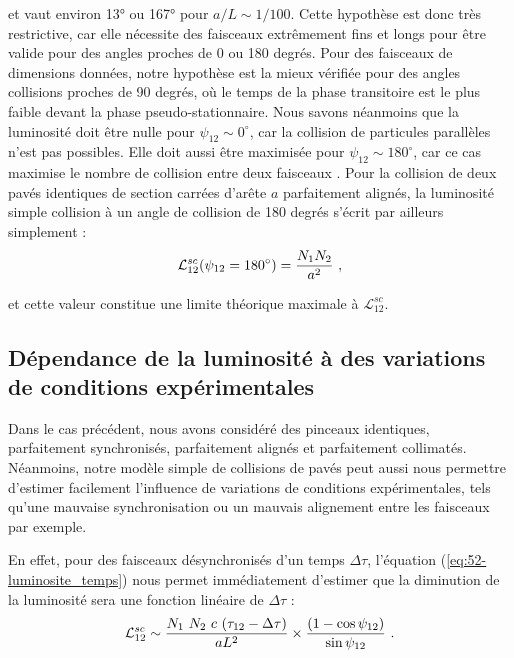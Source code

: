 \begin{refsection}
et vaut environ 13° ou 167° pour $a/L \sim 1/100$. Cette hypothèse est donc très restrictive, car elle nécessite des faisceaux extrêmement fins et longs pour être valide pour des angles proches de 0 ou 180 degrés. Pour des faisceaux de dimensions données, notre hypothèse est la mieux vérifiée pour des angles collisions proches de 90 degrés, où le temps de la phase transitoire est le plus faible devant la phase pseudo-stationnaire. Nous savons néanmoins que la luminosité doit être nulle pour $\psi_{12} \sim 0^\circ$, car la collision de particules parallèles n'est pas possibles. Elle doit aussi être maximisée pour $\psi_{12} \sim 180^\circ$, car ce cas maximise le nombre de collision entre deux faisceaux \parencite{herr_2006}. Pour la collision de deux pavés identiques de section carrées d’arête $a$ parfaitement alignés, la luminosité simple collision à un angle de collision de 180 degrés s'écrit par ailleurs simplement :
\begin{equation}
    \mathcal{L}_{12}^{sc}(\psi_{12}=180^\circ) = \dfrac{N_1 N_2}{a^2} ~ \rm ,
    \label{eq:52-luminosite_contre_propagatif}
\end{equation}

et cette valeur constitue une limite théorique maximale à $\mathcal{L}_{12}^{sc}$.

\subsection{Dépendance de la luminosité à des variations de conditions expérimentales}

Dans le cas précédent, nous avons considéré des pinceaux identiques, parfaitement synchronisés, parfaitement alignés et parfaitement collimatés. Néanmoins, notre modèle simple de collisions de pavés peut aussi nous permettre d'estimer facilement l'influence de variations de conditions expérimentales, tels qu'une mauvaise synchronisation ou un mauvais alignement entre les faisceaux par exemple.

En effet, pour des faisceaux désynchronisés d'un temps $\Delta \tau$, l'équation (\ref{eq:52-luminosite_temps}) nous permet immédiatement d'estimer que la diminution de la luminosité sera une fonction linéaire de $\Delta \tau$ :
\begin{equation}
    \mathcal{L}_{12}^{sc} \sim \dfrac{N_1 ~ N_2 ~ c ~ (\tau_{12}-\Delta \tau)}{a L^2} \times \dfrac{(1-\cos{\psi_{12}})}{\sin{\psi_{12}}} ~ \rm .
    \label{eq:52-luminosite_desynchro}
\end{equation}


\end{refsection}
